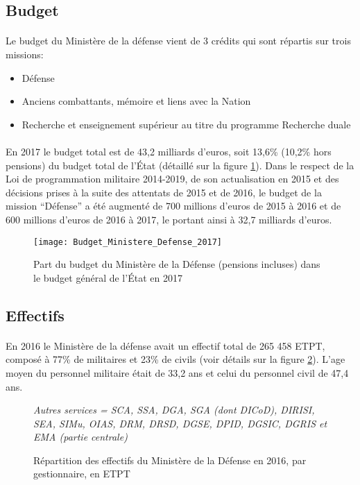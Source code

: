 \documentclass[11pt, book, english, french, standardlists]{upmethodology-document}
\begin{document}
			\subsection{Budget}
				\paragraph*{}
					Le budget du Ministère de la défense vient de 3 crédits qui sont répartis sur trois missions:
					\begin{itemize}
						\item Défense
						\item Anciens combattants, mémoire et liens avec la Nation
						\item Recherche et enseignement supérieur au titre du programme Recherche duale
					\end{itemize}
				\paragraph*{}
					En 2017 le budget total est de 43,2 milliards d'euros, soit 13,6\% (10,2\% hors pensions) du budget total de l'État (détaillé sur la figure \ref{fig:Budget_Ministere_Defense_2017}). Dans le respect de la Loi de programmation militaire 2014-2019, de son actualisation en 2015 et des décisions prises à la suite des attentats de 2015 et de 2016, le budget de la mission ``Défense'' a été augmenté de 700 millions d'euros de 2015 à 2016 et de 600 millions d'euros de 2016 à 2017, le portant ainsi à 32,7 milliards d'euros.
				\begin{figure}[H]
					\centering%
					\texttt{[image: Budget\_Ministere\_Defense\_2017]}
					\caption{Part du budget du Ministère de la Défense (pensions incluses) dans le budget général de l'État en 2017\cite{ChiffresDef2017}}%
					\label{fig:Budget_Ministere_Defense_2017}%
				\end{figure}
			\subsection{Effectifs}
				\paragraph*{}
					En 2016 le Ministère de la défense avait un effectif total de 265 458 \gls{ETPT}, composé à 77\% de militaires et 23\% de civils (voir détails sur la figure \ref{fig:Effectifs_Ministere_Defense_2016}). L'age moyen du personnel militaire était de 33,2 ans et celui du personnel civil de 47,4 ans.
				\begin{figure}[H]
					\centering%
					\caption*{\small\itshape Autres services = \acrshort{SCA}, \acrshort{SSA}, \acrshort{DGA}, \acrshort{SGA} (dont \acrshort{DICoD}), \acrshort{DIRISI}, \acrshort{SEA}, \acrshort{SIMu}, \acrshort{OIAS}, \acrshort{DRM}, \acrshort{DRSD}, \acrshort{DGSE}, \acrshort{DPID}, \acrshort{DGSIC}, \acrshort{DGRIS} et \acrshort{EMA} (partie centrale)}%
					\caption{Répartition des effectifs du Ministère de la Défense en 2016, par gestionnaire, en \acrshort{ETPT}\cite{ChiffresDef2017}}%
					\label{fig:Effectifs_Ministere_Defense_2016}%
				\end{figure}
\end{document}
